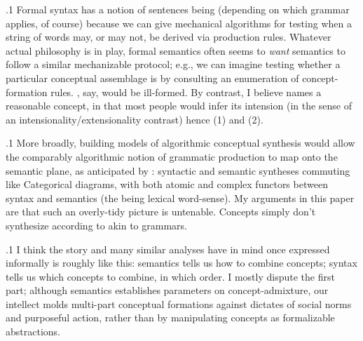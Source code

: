\documentclass[11pt, twocolumn]{article}
\begin{document}
{{\p.1{%
Formal syntax has a notion of sentences being 
(depending on which grammar applies, of course) because we can give
mechanical algorithms for testing when a string of words may, or may not,
be derived via production rules. Whatever actual philosophy is in play,
formal semantics often seems to \textit{want} semantics to follow a
similar mechanizable protocol; e.g., we can imagine testing whether a
particular conceptual assemblage is  by
consulting an enumeration of concept-formation rules.
, say, would be ill-formed. By contrast,
I believe  names a reasonable concept, in
that most people would infer its intension (in the sense of an
intensionality/extensionality contrast) \mdash{} hence \exsRef(1) and \exsRef(2).
}%

\p.1{%
More broadly, building
models of algorithmic conceptual synthesis would allow the comparably
algorithmic notion of grammatic production to map onto the semantic
plane, as anticipated by \Boltetal{}: syntactic and semantic syntheses
commuting like Categorical diagrams, with both atomic and complex functors
between syntax and semantics (the  being lexical word-sense).
My arguments in this paper are that such an overly-tidy picture is
untenable. Concepts simply don't synthesize according to
 akin to  grammars.
}%

\p.1{%
I think the story \Boltetal{} and many similar analyses have
in mind \mdash{} once expressed informally \mdash{} is roughly like this:
semantics tells us how to combine concepts;
syntax tells us which concepts to combine, in which
order. I mostly dispute the first part; although
semantics establishes parameters on concept-admixture,
our intellect molds multi-part
conceptual formations against dictates
of social norms and purposeful action, rather than
by manipulating concepts as formalizable abstractions.
}%

}}
\end{document}
